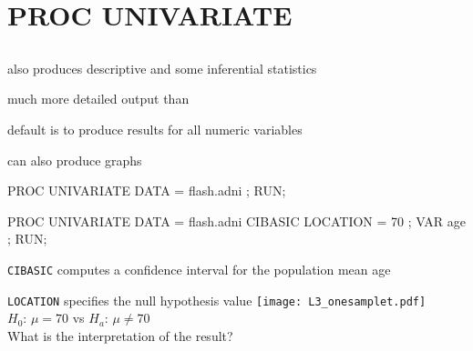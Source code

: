\section[PROC UNIVARIATE]{PROC UNIVARIATE}
\subsection{}
\begin{frame}
\end{frame}

\begin{frame}[fragile]
\bi
\item {} also produces descriptive and some inferential statistics
\item much more detailed output than 
\item default is to produce results for all numeric variables
\item can also produce graphs
\ei
{}
\footnotesize
\begin{code}{.0}
PROC UNIVARIATE DATA = flash.adni ;
RUN;
\end{code}
\emp
\end{frame}

\begin{frame}[fragile]
\footnotesize
\begin{code}{.0}
PROC UNIVARIATE
    DATA = flash.adni
    CIBASIC LOCATION = 70 ;
    VAR age ;
RUN;
\end{code}
\bi
\item \texttt{CIBASIC} computes a confidence interval for the population mean age
\item \texttt{LOCATION} specifies the null hypothesis value
\ei
\emp
{} \hspace{1in} \emp
{}
\texttt{[image: L3\_onesamplet.pdf]}\\
\vskip10pt
$H_0$: $\mu=70$ vs $H_a$: $\mu\neq70$\\
\vskip10pt
\oyo What is the interpretation of the result?
\emp

\end{frame}

